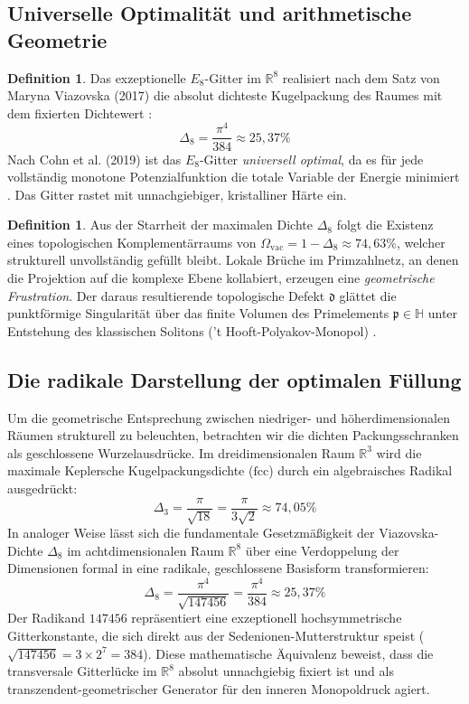 \documentclass[11pt,a4paper]{article}
\newcommand{\R}{\mathbb{R}}
\newcommand{\Halg}{\mathbb{H}}
\newcommand{\Eoct}{E_8}
\theoremstyle{definition}
\newtheorem{definition}[theorem]{Definition}
\begin{document}
	\subsection{Universelle Optimalität und arithmetische Geometrie}
	\begin{definition}
		Das exzeptionelle $\Eoct$-Gitter im $\R^8$ realisiert nach dem Satz von Maryna Viazovska (2017) die absolut dichteste Kugelpackung des Raumes mit dem fixierten Dichtewert \cite{viazovska}:
		\begin{equation}
			\Delta_8 = \frac{\pi^4}{384} \approx 25{,}37\%
		\end{equation}
		Nach Cohn et al. (2019) ist das $\Eoct$-Gitter \textit{universell optimal}, da es für jede vollständig monotone Potenzialfunktion die totale Variable der Energie minimiert \cite{cohn}. Das Gitter rastet mit unnachgiebiger, kristalliner Härte ein.
	\end{definition}
	
	\begin{definition}
		Aus der Starrheit der maximalen Dichte $\Delta_8$ folgt die Existenz eines topologischen Komplementärraums von $\Omega_{\text{vac}} = 1 - \Delta_8 \approx 74{,}63\%$, welcher strukturell unvollständig gefüllt bleibt. Lokale Brüche im Primzahlnetz, an denen die Projektion auf die komplexe Ebene kollabiert, erzeugen eine \textit{geometrische Frustration}. Der daraus resultierende topologische Defekt $\mathfrak{d}$ glättet die punktförmige Singularität über das finite Volumen des Primelements $\mathfrak{p} \in \Halg$ unter Entstehung des klassischen Solitons ('t Hooft-Polyakov-Monopol) \cite{thooft, polyakov}.
	\end{definition}
	
	\subsection{Die radikale Darstellung der optimalen Füllung}
	Um die geometrische Entsprechung zwischen niedriger- und höherdimensionalen Räumen strukturell zu beleuchten, betrachten wir die dichten Packungsschranken als geschlossene Wurzelausdrücke. Im dreidimensionalen Raum $\R^3$ wird die maximale Keplersche Kugelpackungsdichte ($\text{fcc}$) durch ein algebraisches Radikal ausgedrückt:
	\begin{equation}
		\Delta_3 = \frac{\pi}{\sqrt{18}} = \frac{\pi}{3\sqrt{2}} \approx 74{,}05\%
	\end{equation}
	In analoger Weise lässt sich die fundamentale Gesetzmäßigkeit der Viazovska-Dichte $\Delta_8$ im achtdimensionalen Raum $\R^8$ über eine Verdoppelung der Dimensionen formal in eine radikale, geschlossene Basisform transformieren:
	\begin{equation}
		\Delta_8 = \frac{\pi^4}{\sqrt{147456}} = \frac{\pi^4}{384} \approx 25{,}37\%
	\end{equation}
	Der Radikand $147456$ repräsentiert eine exzeptionell hochsymmetrische Gitterkonstante, die sich direkt aus der Sedenionen-Mutterstruktur speist ($\sqrt{147456} = 3 \times 2^7 = 384$). Diese mathematische Äquivalenz beweist, dass die transversale Gitterlücke im $\R^8$ absolut unnachgiebig fixiert ist und als transzendent-geometrischer Generator für den inneren Monopoldruck agiert.
	
\end{document}

